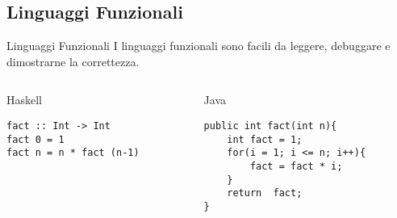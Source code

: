 \subsection{Linguaggi Funzionali} %
\begin{frame}[containsverbatim]{Linguaggi Funzionali}
I linguaggi funzionali sono facili da {\color{blue} leggere}, {\color{blue} debuggare} e {\color{blue} dimostrarne la correttezza}.
\begin{columns}[T]

\begin{column}[T]{.4\textwidth}
\begin{center}
Haskell
\end{center} 
\begin{verbatim}
fact :: Int -> Int 
fact 0 = 1
fact n = n * fact (n-1)
\end{verbatim}
    
\end{column}

\begin{column}[T]{.45\textwidth}
\begin{center}
Java
\end{center} 
\begin{verbatim}
public int fact(int n){
    int fact = 1;
    for(i = 1; i <= n; i++){
        fact = fact * i;
    }
    return  fact;
}
\end{verbatim}
    
\end{column}

\end{columns}

\end{frame}

